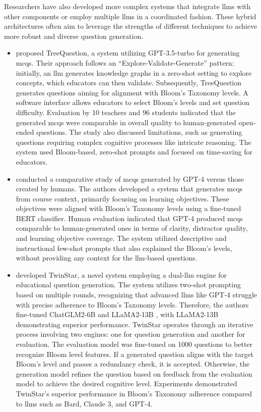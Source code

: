  Researchers have also developed more complex systems that integrate \ac{llms} with other components or employ multiple \ac{llms} in a coordinated fashion. These hybrid architectures often aim to leverage the strengths of different techniques to achieve more robust and diverse question generation.
\begin{itemize}
    \item \cite{cheng_treequestion_2024} proposed TreeQuestion, a system utilizing GPT-3.5-turbo for generating \ac{mcqs}. Their approach follows an \enquote{Explore-Validate-Generate} pattern: initially, an \ac{llm} generates knowledge graphs in a zero-shot setting to explore concepts, which educators can then validate. Subsequently, TreeQuestion generates questions aiming for alignment with Bloom's Taxonomy levels. A software interface allows educators to select Bloom's levels and set question difficulty. Evaluation by 10 teachers and 96 students indicated that the generated \ac{mcqs} were comparable in overall quality to human-generated open-ended questions. The study also discussed limitations, such as generating questions requiring complex cognitive processes like intricate reasoning. The system used Bloom-based, zero-shot prompts and focused on time-saving for educators.
    \item \cite{doughty_comparative_2024} conducted a comparative study of \ac{mcqs} generated by GPT-4 versus those created by humans. The authors developed a system that generates \ac{mcqs} from course context, primarily focusing on learning objectives. These objectives were aligned with Bloom's Taxonomy levels using a fine-tuned BERT classifier. Human evaluation indicated that GPT-4 produced \ac{mcqs} comparable to human-generated ones in terms of clarity, distractor quality, and learning objective coverage. The system utilized descriptive and instructional few-shot prompts that also explained the Bloom's levels, without providing any context for the \ac{llm}-based questions.
    \item \cite{zhuge_twinstar_2025} developed TwinStar, a novel system employing a dual-\ac{llm} engine for educational question generation. The system utilizes two-shot prompting based on multiple rounds, recognizing that advanced \ac{llms} like GPT-4 struggle with precise adherence to Bloom's Taxonomy levels. Therefore, the authors fine-tuned ChatGLM2-6B \cite{glm_chatglm_2024} and LLaMA2-13B \cite{touvron_llama_2023-1}, with LLaMA2-13B demonstrating superior performance. TwinStar operates through an iterative process involving two engines: one for question generation and another for evaluation. The evaluation model was fine-tuned on 1000 questions to better recognize Bloom level features. If a generated question aligns with the target Bloom's level and passes a redundancy check, it is accepted. Otherwise, the generation model refines the question based on feedback from the evaluation model to achieve the desired cognitive level. Experiments demonstrated TwinStar's superior performance in Bloom's Taxonomy adherence compared to \ac{llms} such as Bard, Claude 3, and GPT-4.

\end{itemize}
